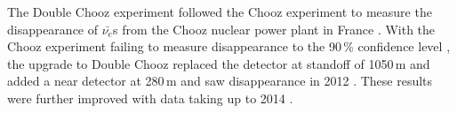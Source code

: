 The Double Chooz experiment followed the Chooz experiment to measure the disappearance of $\bar{\nu_e}$s from the Chooz nuclear power plant in France \cite{lasserre2006}. With the Chooz experiment failing to measure disappearance to the 90\,\% confidence level \cite{Apollonio_2003}, the upgrade to Double Chooz replaced the detector at standoff of 1050\,m and added a near detector at 280\,m and saw disappearance in 2012 \cite{Abe_2012}. These results were further improved with data taking up to 2014 \cite{abe2014improved}.

